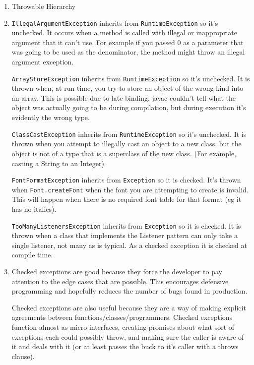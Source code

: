 \documentclass[12pt]{chmullighw}
\begin{document}
\begin{enumerate}
\item Throwable Hierarchy



\item 
\texttt{IllegalArgumentException} inherits from \texttt{RuntimeException} so it's unchecked. It occurs when a method is called with illegal or inappropriate argument that it can't use. For example if you passed 0 as a parameter that was going to be used as the denominator, the method might throw an illegal argument exception.

\texttt{ArrayStoreException} inherits from \texttt{RuntimeException} so it's unchecked. It is thrown when, at run time, you try to store an object of the wrong kind into an array. This is possible due to late binding, javac couldn't tell what the object was actually going to be during compilation, but during execution it's evidently the wrong type.

\texttt{ClassCastException} inherits from \texttt{RuntimeException} so it's unchecked. It is thrown when you attempt to illegally cast an object to a new class, but the object is not of a type that is a superclass of the new class. (For example, casting a String to an Integer). 

\texttt{FontFormatException} inherits from \texttt{Exception} so it is checked. It's thrown when \texttt{Font.createFont} when the font you are attempting to create is invalid. This will happen when there is no required font table for that format (eg it has no italics).

\texttt{TooManyListenersException} inherits from \texttt{Exception} so it is checked. It is thrown when a class that implements the Listener pattern can only take a single listener, not many as is typical. As a checked exception it is checked at compile time.


\item Checked exceptions are good because they force the developer to pay attention to the edge cases that are possible. This encourages defensive programming and hopefully reduces the number of bugs found in production.

Checked exceptions are also useful because they are a way of making explicit agreements between functions/classes/programmers. Checked exceptions function almost as micro interfaces, creating promises about what sort of exceptions each could possibly throw, and making sure the caller is aware of it and deals with it (or at least passes the buck to it's caller with a throws clause).


\end{enumerate}
\end{document}
